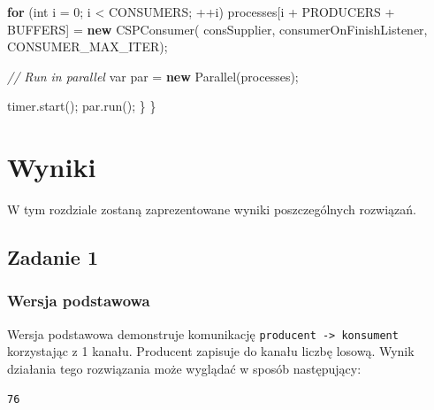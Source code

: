 \documentclass[11pt]{article}
\newenvironment{Shaded}{}{}
\newcommand{\KeywordTok}[1]{\textcolor[rgb]{0.00,0.44,0.13}{\textbf{{#1}}}}
\newcommand{\DataTypeTok}[1]{\textcolor[rgb]{0.56,0.13,0.00}{{#1}}}
\newcommand{\DecValTok}[1]{\textcolor[rgb]{0.25,0.63,0.44}{{#1}}}
\newcommand{\CommentTok}[1]{\textcolor[rgb]{0.38,0.63,0.69}{\textit{{#1}}}}
\newcommand{\FunctionTok}[1]{\textcolor[rgb]{0.02,0.16,0.49}{{#1}}}
\newcommand{\NormalTok}[1]{{#1}}
\newcommand{\ControlFlowTok}[1]{\textcolor[rgb]{0.00,0.44,0.13}{\textbf{{#1}}}}
\newcommand{\OperatorTok}[1]{\textcolor[rgb]{0.40,0.40,0.40}{{#1}}}
\begin{document}
\begin{Shaded}
\begin{Highlighting}[]
        \ControlFlowTok{for} \OperatorTok{(}\DataTypeTok{int}\NormalTok{ i }\OperatorTok{=} \DecValTok{0}\OperatorTok{;}\NormalTok{ i }\OperatorTok{\textless{}}\NormalTok{ CONSUMERS}\OperatorTok{;} \OperatorTok{++}\NormalTok{i}\OperatorTok{)}
\NormalTok{            processes}\OperatorTok{[}\NormalTok{i }\OperatorTok{+}\NormalTok{ PRODUCERS }\OperatorTok{+}\NormalTok{ BUFFERS}\OperatorTok{]} \OperatorTok{=} \KeywordTok{new} \FunctionTok{CSPConsumer}\OperatorTok{(}
\NormalTok{                consSupplier}\OperatorTok{,}\NormalTok{ consumerOnFinishListener}\OperatorTok{,}\NormalTok{ CONSUMER\_MAX\_ITER}\OperatorTok{);}

        \CommentTok{// Run in parallel}
        \DataTypeTok{var}\NormalTok{ par }\OperatorTok{=} \KeywordTok{new} \FunctionTok{Parallel}\OperatorTok{(}\NormalTok{processes}\OperatorTok{);}

\NormalTok{        timer}\OperatorTok{.}\FunctionTok{start}\OperatorTok{();}
\NormalTok{        par}\OperatorTok{.}\FunctionTok{run}\OperatorTok{();}
    \OperatorTok{\}}
\OperatorTok{\}}
\end{Highlighting}
\end{Shaded}

    \hypertarget{wyniki}{%
\section{Wyniki}\label{wyniki}}

W tym rozdziale zostaną zaprezentowane wyniki poszczególnych rozwiązań.

    \hypertarget{zadanie-1}{%
\subsection{Zadanie 1}\label{zadanie-1}}

    \hypertarget{wersja-podstawowa}{%
\subsubsection{Wersja podstawowa}\label{wersja-podstawowa}}

Wersja podstawowa demonstruje komunikację
\texttt{producent\ -\textgreater{}\ konsument} korzystając z 1 kanału.
Producent zapisuje do kanału liczbę losową. Wynik działania tego
rozwiązania może wyglądać w sposób następujący:

\begin{verbatim}
76
\end{verbatim}
\end{document}
